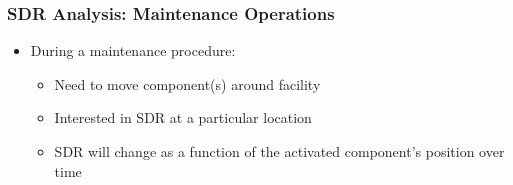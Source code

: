 \documentclass{beamer}
\begin{document}
\begin{frame}
\frametitle{SDR Analysis: Maintenance Operations}
	\begin{itemize}
		\item{During a maintenance procedure:}
			\begin{itemize}
				\item{Need to move component(s) around facility}
				\item{Interested in SDR at a particular
					location}
				\item{SDR will change as a function of the
					activated component's position over
					time}
			\end{itemize}
	\end{itemize}
	\begin{center}
	\end{center}
\end{frame}
\end{document}
